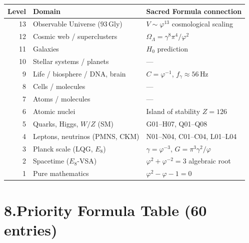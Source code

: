\documentclass[12pt,a4paper]{article}
\newcommand{\ph}{\varphi}
\begin{document}
\begin{center}\small
\renewcommand{\arraystretch}{1.15}
\begin{tabular}{rll}
\toprule
\textbf{Level} & \textbf{Domain} & \textbf{Sacred Formula connection} \\
\midrule
13 & Observable Universe ($93\,$Gly) & $V\sim\ph^{13}$ cosmological scaling \\
12 & Cosmic web / superclusters & $\Omega_\Lambda = \gamma^8\pi^4/\ph^2$ \\
11 & Galaxies & $H_0$ prediction \\
10 & Stellar systems / planets & --- \\
9  & Life / biosphere / DNA, brain & $C=\ph^{-1}$, $f_\gamma\approx56\,$Hz \\
8  & Cells / molecules & --- \\
7  & Atoms / molecules & --- \\
6  & Atomic nuclei & Island of stability $Z=126$ \\
5  & Quarks, Higgs, $W/Z$ (SM) & G01--H07, Q01--Q08 \\
4  & Leptons, neutrinos (PMNS, CKM) & N01--N04, C01--C04, L01--L04 \\
3  & Planck scale (LQG, $E_8$) & $\gamma=\ph^{-3}$, $G=\pi^3\gamma^2/\ph$ \\
2  & Spacetime ($E_8$-VSA) & $\ph^2+\ph^{-2}=3$ algebraic root \\
1  & Pure mathematics & $\ph^2-\ph-1=0$ \\
\bottomrule
\end{tabular}
\end{center}

\section*{8.\quad Priority Formula Table (60 entries)}
\end{document}
